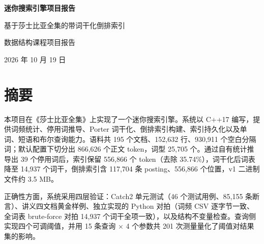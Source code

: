 \documentclass[UTF8,a4paper,12pt]{ctexrep}
\begin{document}

\hypersetup{pageanchor=false}
\begin{titlepage}
\centering
\vspace*{2.2cm}

{\Huge\bfseries 迷你搜索引擎项目报告\par}

\vspace{0.9cm}
{\LARGE 基于莎士比亚全集的带词干化倒排索引\par}

\vspace{2.2cm}
{\large 数据结构课程项目报告\par}

\vspace{0.5cm}
{\large 2026 年 10 月 19 日\par}

\vfill
\end{titlepage}
\hypersetup{pageanchor=true}

\chapter*{摘要}
\begingroup\small
本项目在《莎士比亚全集》上实现了一个迷你搜索引擎。系统以 C++17 编写，提供词频统计、停用词推导、Porter 词干化、倒排索引构建、索引持久化以及单词、短语和布尔查询能力。语料共 195 个文档、152,632 行、930,911 个空白分隔词；默认配置下切分出 866,626 个正文 token，词型 25,705 个。通过自有统计推导出 39 个停用词后，索引保留 556,866 个 token（去除 35.74\%），词干化后词表降至 14,937 个词干，倒排索引含 117,704 条 posting、556,866 个位置，v1 二进制文件约 3.5 MB。

正确性方面，系统采用四层验证：Catch2 单元测试（46 个测试用例、85,155 条断言）、讲义四文档黄金样例、独立实现的 Python 对拍（词频 CSV 逐字节一致、全词表 brute-force 对拍 14,937 个词干全项一致），以及结构不变量检查。查询侧实现四个可调阈值，并用 15 条查询 $\times$ 4 个参数共 201 次测量量化了阈值对结果集的影响。
\end{document}
